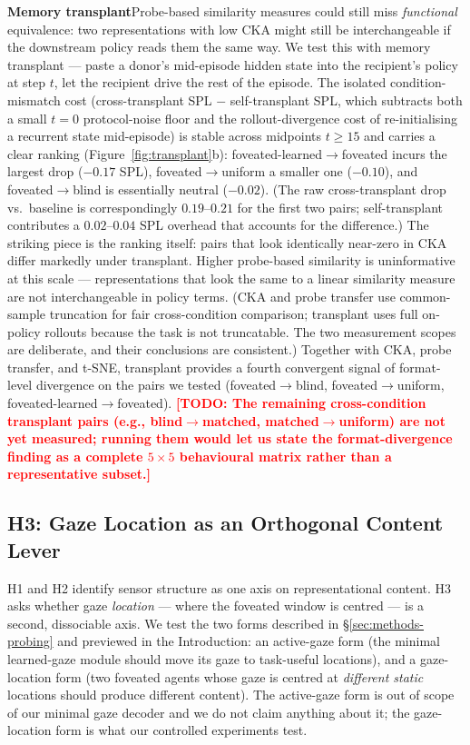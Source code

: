 \documentclass{article}
\newcommand{\TODO}[1]{\textcolor{red}{\textbf{[TODO: #1]}}}
\begin{document}
\noindent\textbf{Memory transplant}\quad Probe-based similarity measures could still miss \emph{functional} equivalence: two representations with low CKA might still be interchangeable if the downstream policy reads them the same way. We test this with memory transplant --- paste a donor's mid-episode hidden state into the recipient's policy at step $t$, let the recipient drive the rest of the episode. The isolated condition-mismatch cost (cross-transplant SPL $-$ self-transplant SPL, which subtracts both a small $t{=}0$ protocol-noise floor and the rollout-divergence cost of re-initialising a recurrent state mid-episode) is stable across midpoints $t\geq 15$ and carries a clear ranking (Figure~\ref{fig:transplant}b): foveated-learned$\to$foveated incurs the largest drop ($-0.17$ SPL), foveated$\to$uniform a smaller one ($-0.10$), and foveated$\to$blind is essentially neutral ($-0.02$). (The raw cross-transplant drop vs.\ baseline is correspondingly $0.19$--$0.21$ for the first two pairs; self-transplant contributes a $0.02$--$0.04$ SPL overhead that accounts for the difference.) The striking piece is the ranking itself: pairs that look identically near-zero in CKA differ markedly under transplant. Higher probe-based similarity is uninformative at this scale --- representations that look the same to a linear similarity measure are not interchangeable in policy terms. (CKA and probe transfer use common-sample truncation for fair cross-condition comparison; transplant uses full on-policy rollouts because the task is not truncatable. The two measurement scopes are deliberate, and their conclusions are consistent.) Together with CKA, probe transfer, and t-SNE, transplant provides a fourth convergent signal of format-level divergence on the pairs we tested (foveated$\to$blind, foveated$\to$uniform, foveated-learned$\to$foveated). \TODO{The remaining cross-condition transplant pairs (e.g., blind$\to$matched, matched$\to$uniform) are not yet measured; running them would let us state the format-divergence finding as a complete $5{\times}5$ behavioural matrix rather than a representative subset.}


\subsection{H3: Gaze Location as an Orthogonal Content Lever}
\label{sec:h3}

H1 and H2 identify sensor structure as one axis on representational content. H3 asks whether gaze \emph{location} --- where the foveated window is centred --- is a second, dissociable axis. We test the two forms described in §\ref{sec:methods-probing} and previewed in the Introduction: an active-gaze form (the minimal learned-gaze module should move its gaze to task-useful locations), and a gaze-location form (two foveated agents whose gaze is centred at \emph{different static} locations should produce different content). The active-gaze form is out of scope of our minimal gaze decoder and we do not claim anything about it; the gaze-location form is what our controlled experiments test.
\end{document}
